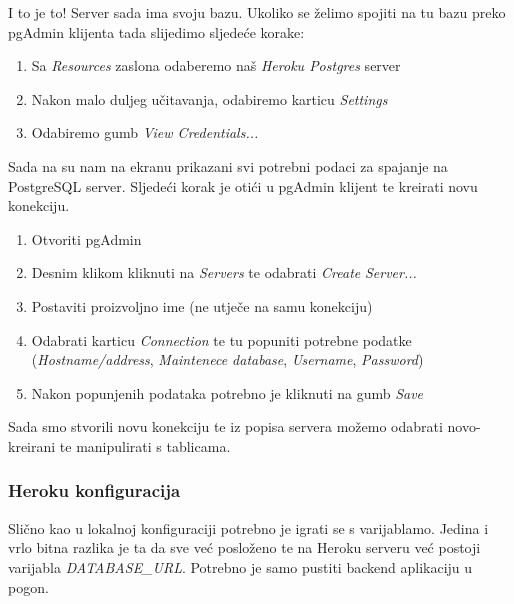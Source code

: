 		        I to je to! Server sada ima svoju bazu. Ukoliko se želimo spojiti na tu bazu preko pgAdmin klijenta tada slijedimo sljedeće korake:
		        
		         \begin{enumerate}
		            \item Sa \textit{Resources} zaslona odaberemo naš \textit{Heroku Postgres} server
		            \item Nakon malo duljeg učitavanja, odabiremo karticu \textit{Settings}
		            \item Odabiremo gumb \textit{View Credentials...}
		        \end{enumerate}
		        
		        Sada na su nam na ekranu prikazani svi potrebni podaci za spajanje na PostgreSQL server. Sljedeći korak je otići u pgAdmin klijent te kreirati novu konekciju.
		        
		         \begin{enumerate}
		            \item Otvoriti pgAdmin
		            \item Desnim klikom kliknuti na \textit{Servers} te odabrati \textit{Create} \textit{Server...}
		            \item Postaviti proizvoljno ime (ne utječe na samu konekciju)
		            \item Odabrati karticu \textit{Connection} te tu popuniti potrebne podatke (\textit{Hostname/address}, \textit{Maintenece database}, \textit{Username}, \textit{Password})
		            \item Nakon popunjenih podataka potrebno je kliknuti na gumb \textit{Save}
		        \end{enumerate}
		        
		        Sada smo stvorili novu konekciju te iz popisa servera možemo odabrati novo-kreirani te manipulirati s tablicama.
		        
		
		    \subsubsection*{Heroku konfiguracija}
		        
		        Slično kao u lokalnoj konfiguraciji potrebno je igrati se s varijablamo. Jedina i vrlo bitna razlika je ta da sve već posloženo te na Heroku serveru već postoji varijabla \textit{DATABASE\_URL}. Potrebno je samo pustiti backend aplikaciju u pogon.
		    